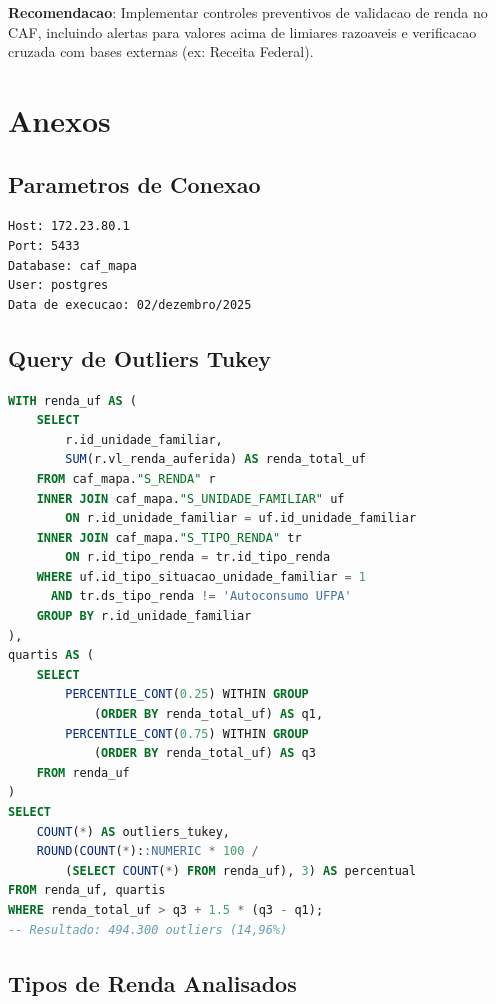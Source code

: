 \documentclass[11pt,a4paper]{article}
\begin{document}
\textbf{Recomendacao}: Implementar controles preventivos de validacao de renda no CAF,
incluindo alertas para valores acima de limiares razoaveis e verificacao cruzada com
bases externas (ex: Receita Federal).

\section{Anexos}

\subsection{Parametros de Conexao}

\begin{verbatim}
Host: 172.23.80.1
Port: 5433
Database: caf_mapa
User: postgres
Data de execucao: 02/dezembro/2025
\end{verbatim}

\subsection{Query de Outliers Tukey}

\begin{lstlisting}[language=SQL, caption={Identificacao de outliers pela regra de Tukey}]
WITH renda_uf AS (
    SELECT
        r.id_unidade_familiar,
        SUM(r.vl_renda_auferida) AS renda_total_uf
    FROM caf_mapa."S_RENDA" r
    INNER JOIN caf_mapa."S_UNIDADE_FAMILIAR" uf
        ON r.id_unidade_familiar = uf.id_unidade_familiar
    INNER JOIN caf_mapa."S_TIPO_RENDA" tr
        ON r.id_tipo_renda = tr.id_tipo_renda
    WHERE uf.id_tipo_situacao_unidade_familiar = 1
      AND tr.ds_tipo_renda != 'Autoconsumo UFPA'
    GROUP BY r.id_unidade_familiar
),
quartis AS (
    SELECT
        PERCENTILE_CONT(0.25) WITHIN GROUP
            (ORDER BY renda_total_uf) AS q1,
        PERCENTILE_CONT(0.75) WITHIN GROUP
            (ORDER BY renda_total_uf) AS q3
    FROM renda_uf
)
SELECT
    COUNT(*) AS outliers_tukey,
    ROUND(COUNT(*)::NUMERIC * 100 /
        (SELECT COUNT(*) FROM renda_uf), 3) AS percentual
FROM renda_uf, quartis
WHERE renda_total_uf > q3 + 1.5 * (q3 - q1);
-- Resultado: 494.300 outliers (14,96%)
\end{lstlisting}

\subsection{Tipos de Renda Analisados}
\end{document}
